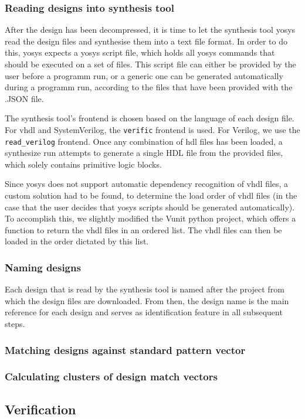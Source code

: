 \subsubsection{Reading designs into synthesis tool} 
After the design has been decompressed, it is time to let the synthesis tool 
yosys read the design files and synthesise them into a text file format. In 
order to do this, yosys expects a yosys script file, which holds all yosys commands 
that should be executed on a set of files. This script file can either be provided
by the user before a programm run, or a generic one can be generated automatically 
during a programm run, according to the files that have been provided with the 
.JSON file. 

The synthesis tool's frontend is chosen based on the language of each design file.
For \gls{vhdl} and SystemVerilog, the \lstinline{verific} frontend is used. For Verilog,
we use the \lstinline{read_verilog} frontend. Once any combination of \gls{hdl} files
has been loaded, a synthesize run attempts to generate a single HDL file from the provided
files, which solely contains primitive logic blocks. 

Since yosys does not support automatic dependency recognition of vhdl files, a custom solution
had to be found, to determine the load order of vhdl files (in the case that the user decides
that yosys scripts should be generated automatically). To accomplish this, we slightly modified 
the Vunit python project, which offers a function to return the \gls{vhdl} 
files in an ordered list. The vhdl files can then be loaded in the order dictated by this list.  

\subsubsection{Naming designs} 
Each design that is read by the synthesis tool is named after the project from
which the design files are downloaded. From then, the design name is the main
reference for each design and serves as identification feature in all
subsequent steps.

\subsubsection{Matching designs against standard pattern vector}
\subsubsection{Calculating clusters of design match vectors}

\subsection{Verification}



